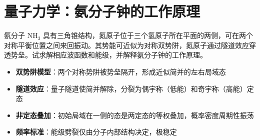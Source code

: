 \section{量子力学：氨分子钟的工作原理}
\label{sec:ammonia-maser}

\begin{modelbox}[题目：氨分子钟的工作原理]
氨分子 NH$_3$ 具有三角锥结构，氮原子位于三个氢原子所在平面的两侧，可在两个对称平衡位置之间来回振动。其势能可近似为对称双势阱，氮原子通过隧道效应穿透势垒。试求解相应波函数和能级，并解释氨分子钟的工作原理。
\end{modelbox}

\begin{tipbox}[考点快速分析]
\begin{itemize}
    \item \textbf{双势阱模型}：两个对称势阱被势垒隔开，形成近似简并的左右局域态
    \item \textbf{隧道效应}：量子隧道使简并解除，分裂为偶宇称（低能）和奇宇称（高能）定态
    \item \textbf{非定态叠加}：初始局域在一侧的态是两定态的等权叠加，概率密度周期性振荡
    \item \textbf{频率标准}：能级劈裂仅由分子内部结构决定，极稳定
\end{itemize}
\end{tipbox}

